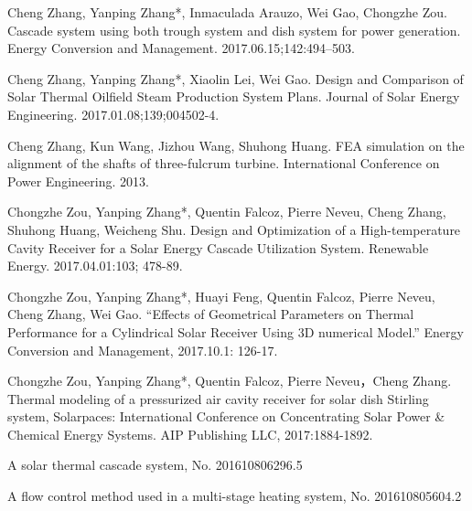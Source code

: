 \begin{publications}
  \item Cheng Zhang, Yanping Zhang*, Inmaculada Arauzo, Wei Gao, Chongzhe  Zou. Cascade system using both trough system and dish system for power generation. Energy Conversion and Management. 2017.06.15;142:494–503.
  \item Cheng Zhang, Yanping Zhang*, Xiaolin Lei, Wei Gao. Design and Comparison of Solar Thermal Oilfield Steam Production System Plans. Journal of Solar Energy Engineering. 2017.01.08;139;004502-4.
  \item Cheng Zhang, Kun Wang, Jizhou Wang, Shuhong Huang. FEA simulation on the alignment of the shafts of three-fulcrum turbine. International Conference on Power Engineering. 2013.
  \item Chongzhe Zou, Yanping Zhang*, Quentin Falcoz, Pierre Neveu, Cheng Zhang, Shuhong Huang, Weicheng Shu. Design and Optimization of a High-temperature Cavity Receiver for a Solar Energy Cascade Utilization System. Renewable Energy. 2017.04.01:103; 478-89. 
	\item Chongzhe Zou, Yanping Zhang*, Huayi Feng, Quentin Falcoz, Pierre Neveu, Cheng Zhang, Wei Gao. “Effects of Geometrical Parameters on Thermal Performance for a Cylindrical Solar Receiver Using 3D numerical Model.” Energy Conversion and Management, 2017.10.1: 126-17.
  \item Chongzhe Zou, Yanping Zhang*, Quentin Falcoz, Pierre Neveu，Cheng Zhang. Thermal modeling of a pressurized air cavity receiver for solar dish Stirling system, Solarpaces: International Conference on Concentrating Solar Power \& Chemical Energy Systems. AIP Publishing LLC, 2017:1884-1892.
  
  \item A solar thermal cascade system, No. 201610806296.5
  \item A flow control method used in a multi-stage heating system, No. 201610805604.2
  
\end{publications}